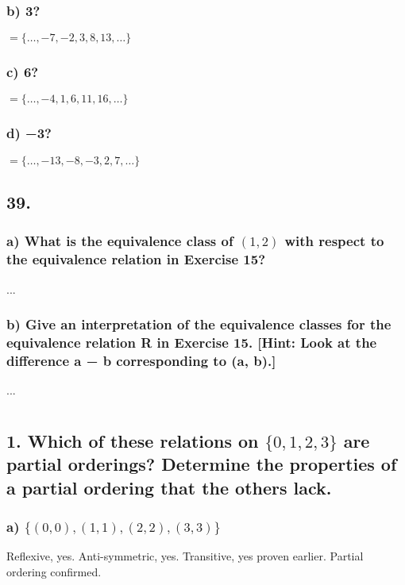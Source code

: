 \documentclass[11pt, oneside]{article} %
\numberwithin{equation}{section} %
\numberwithin{figure}{section} %
\numberwithin{table}{section} %
\begin{document}
\subsubsection{b) 3?}
$=\{ \ldots, -7, -2, 3, 8, 13, \ldots \}$
\subsubsection{c) 6?}
$=\{ \ldots, -4, 1, 6, 11, 16, \ldots \}$
\subsubsection{d) −3?}
$=\{ \ldots, -13, -8, -3, 2, 7, \ldots \}$


\subsection{39.}
\subsubsection{a) What is the equivalence class of $(1, 2)$ with respect to the equivalence relation in Exercise 15?}
...
\subsubsection{b) Give an interpretation of the equivalence classes for the equivalence relation R in Exercise 15. [Hint: Look at the difference a − b corresponding to (a, b).]}
...

\section{}
\subsection{1. Which of these relations on $\{0, 1, 2, 3\}$ are partial orderings? Determine the properties of a partial ordering that the others lack.}
\subsubsection{a) $\{(0, 0), (1, 1), (2, 2), (3, 3)\}$}
Reflexive, yes. Anti-symmetric, yes. Transitive, yes proven earlier. Partial ordering confirmed.
\end{document}
